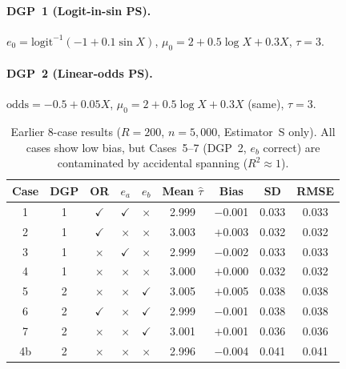 \documentclass[11pt,letterpaper]{article}
\newcommand{\logit}{\mathrm{logit}}
\begin{document}
\paragraph{DGP~1 (Logit-in-sin PS).}
$e_0 = \logit^{-1}(-1 + 0.1\sin X)$,\;
$\mu_0 = 2 + 0.5\log X + 0.3 X$,\;
$\tau = 3$.

\paragraph{DGP~2 (Linear-odds PS).}
$\mathrm{odds} = -0.5 + 0.05 X$,\;
$\mu_0 = 2 + 0.5\log X + 0.3 X$ (same),\;
$\tau = 3$.

\begin{table}[H]
\centering
\caption{Earlier 8-case results ($R=200$, $n=5{,}000$, Estimator~S only).
All cases show low bias, but Cases~5--7 (DGP~2, $e_b$ correct) are
contaminated by accidental spanning ($R^2 \approx 1$).}
\label{tab:results-old}
\begin{tabular}{ccccccccc}
\toprule
\textbf{Case} & \textbf{DGP} & \textbf{OR} & $e_a$ & $e_b$ & \textbf{Mean $\hat\tau$} & \textbf{Bias} & \textbf{SD} & \textbf{RMSE} \\
\midrule
1  & 1 & $\checkmark$ & $\checkmark$ & $\times$ & 2.999 & $-$0.001 & 0.033 & 0.033 \\
2  & 1 & $\checkmark$ & $\times$ & $\times$ & 3.003 & $+$0.003 & 0.032 & 0.032 \\
3  & 1 & $\times$ & $\checkmark$ & $\times$ & 2.999 & $-$0.002 & 0.033 & 0.033 \\
4  & 1 & $\times$ & $\times$ & $\times$ & 3.000 & $+$0.000 & 0.032 & 0.032 \\
\midrule
5  & 2 & $\times$ & $\times$ & $\checkmark$ & 3.005 & $+$0.005 & 0.038 & 0.038 \\
6  & 2 & $\checkmark$ & $\times$ & $\checkmark$ & 2.999 & $-$0.001 & 0.038 & 0.038 \\
7  & 2 & $\times$ & $\times$ & $\checkmark$ & 3.001 & $+$0.001 & 0.036 & 0.036 \\
4b & 2 & $\times$ & $\times$ & $\times$ & 2.996 & $-$0.004 & 0.041 & 0.041 \\
\bottomrule
\end{tabular}
\end{table}
\end{document}
